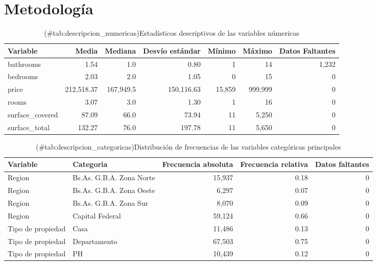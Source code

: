 \documentclass[
  spanish,
  11pt,
  titlepage]{article}
\begin{document}
\section{Metodología}\label{metodologuxeda}

\begin{table}[H][!h]
\centering
\caption{(\#tab:descripcion_numericas)Estadísticos descriptivos de las variables númericas}
\centering
\begin{tabular}[t]{l|r|r|r|r|r|r}
\hline
\textbf{Variable} & \textbf{Media} & \textbf{Mediana} & \textbf{Desvío estándar} & \textbf{Mínimo} & \textbf{Máximo} & \textbf{Datos Faltantes}\\
\hline
bathrooms & 1.54 & 1.0 & 0.80 & 1 & 14 & 1,232\\
\hline
bedrooms & 2.03 & 2.0 & 1.05 & 0 & 15 & 0\\
\hline
price & 212,518.37 & 167,949.5 & 150,116.63 & 15,859 & 999,999 & 0\\
\hline
rooms & 3.07 & 3.0 & 1.30 & 1 & 16 & 0\\
\hline
surface\_covered & 87.09 & 66.0 & 73.94 & 11 & 5,250 & 0\\
\hline
surface\_total & 132.27 & 76.0 & 197.78 & 11 & 5,650 & 0\\
\hline
\end{tabular}
\end{table}

\begin{table}[H][!h]
\centering
\caption{(\#tab:descripcion_categoricas)Distribución de frecuencias de las variables categóricas principales}
\centering
\begin{tabular}[t]{l|l|r|r|r}
\hline
\textbf{Variable} & \textbf{Categoria} & \textbf{Frecuencia absoluta} & \textbf{Frecuencia relativa} & \textbf{Datos faltantes}\\
\hline
Region & Bs.As. G.B.A. Zona Norte & 15,937 & 0.18 & 0\\
\hline
Region & Bs.As. G.B.A. Zona Oeste & 6,297 & 0.07 & 0\\
\hline
Region & Bs.As. G.B.A. Zona Sur & 8,070 & 0.09 & 0\\
\hline
Region & Capital Federal & 59,124 & 0.66 & 0\\
\hline
Tipo de propiedad & Casa & 11,486 & 0.13 & 0\\
\hline
Tipo de propiedad & Departamento & 67,503 & 0.75 & 0\\
\hline
Tipo de propiedad & PH & 10,439 & 0.12 & 0\\
\hline
\end{tabular}
\end{table}
\end{document}
